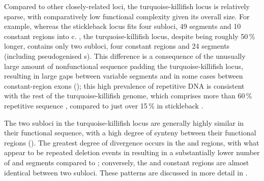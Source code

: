Compared to other closely-related loci, the turquoise-killifish locus is relatively sparse, with comparatively low functional complexity given its overall size. For example, whereas the stickleback locus fits four subloci, 49 \vh segments and 10 constant regions into c.  \parencite{bao2010stickleback,gambondeza2011stickleback}, the turquoise-killifish locus, despite being roughly 50\,\% longer, contains only two subloci, four constant regions and 24 \vh segments (including pseudogenised \vh{}s). This difference is a consequence of the unusually large amount of nonfunctional sequence padding the turquoise-killifish locus, resulting in large gaps between variable segments and in some cases between constant-region exons (); this high prevalence of repetitive DNA is consistent with the rest of the turquoise-killifish genome, which comprises more than 60\,\% repetitive sequence \parencite{willemsen2019popgen}, compared to just over 15\,\% in stickleback \parencite{yuan2018repeats}.
	
The two subloci in the turquoise-killifish locus are generally highly similar in their functional sequence, with a high degree of synteny between their functional regions (). The greatest degree of divergence occurs in the \vh and \dh regions, with what appear to be repeated deletion events in  resulting in a substantially lower number of \vh and \dh segments compared to ; conversely, the \jh and constant regions are almost identical between two subloci. These patterns are discussed in more detail in .
	
